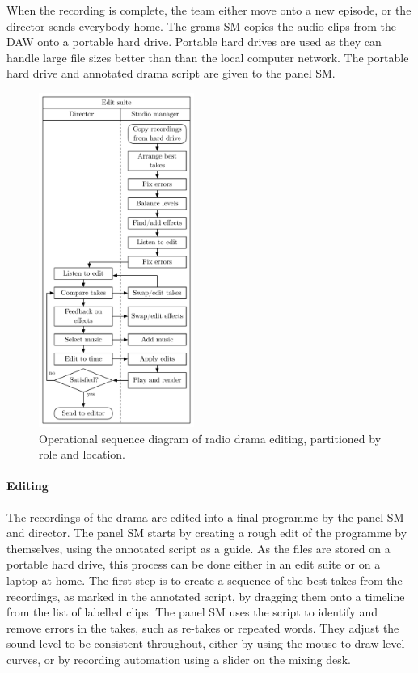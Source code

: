 When the recording is complete, the team either move onto a new episode, or the director sends everybody home.  The
grams SM copies the audio clips from the DAW onto a portable hard drive.  Portable hard drives are used as they can
handle large file sizes better than than the local computer network.  The portable hard drive and annotated drama
script are given to the panel SM.

\begin{figure}[ht]
  \centering
  \includegraphics[width=2in]{figs/drama-editing-workflow.pdf}
  \caption{Operational sequence diagram of radio drama editing, partitioned by role and location.}
  \label{fig:ethno-drama-editing}
\end{figure}

\paragraph{Editing}
The recordings of the drama are edited into a final programme by the panel SM and director. The panel SM starts by
creating a rough edit of the programme by themselves, using the annotated script as a guide.  As the files are stored
on a portable hard drive, this process can be done either in an edit suite or on a laptop at home. The first step is to
create a sequence of the best takes from the recordings, as marked in the annotated script, by dragging them onto a
timeline from the list of labelled clips.  The panel SM uses the script to identify and remove errors in the takes,
such as re-takes or repeated words.  They adjust the sound level to be consistent throughout, either by using the mouse
to draw level curves, or by recording automation using a slider on the mixing desk.


